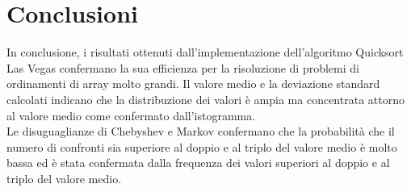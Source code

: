\documentclass[12pt]{article}
\begin{document}
\section{Conclusioni}
In conclusione, i risultati ottenuti dall'implementazione dell'algoritmo 
Quicksort Las Vegas confermano la sua efficienza per la risoluzione di
problemi di ordinamenti di array molto grandi. Il valore medio e la 
deviazione standard calcolati indicano che la distribuzione dei valori
è ampia ma concentrata attorno al valore medio come confermato 
dall'istogramma.\\
Le disuguaglianze di Chebyshev e Markov confermano che la probabilità
che il numero di confronti sia superiore al doppio e al triplo del valore 
medio è molto bassa ed è stata confermata dalla frequenza dei valori
superiori al doppio e al triplo del valore medio.
\end{document}
